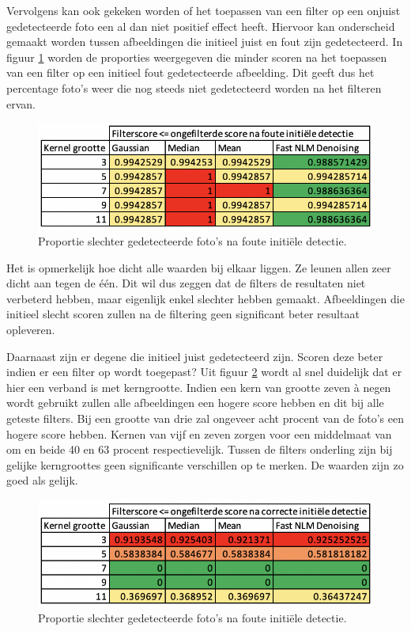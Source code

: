 Vervolgens kan ook gekeken worden of het toepassen van een filter op een onjuist gedetecteerde foto een al dan niet positief effect heeft.
Hiervoor kan onderscheid gemaakt worden tussen afbeeldingen die initieel juist en fout zijn gedetecteerd. 
In figuur \ref{fig:initieelfout} worden de proporties weergegeven die minder scoren na het toepassen van een filter op een initieel fout gedetecteerde afbeelding. Dit geeft dus het percentage foto's weer die nog steeds niet gedetecteerd worden na het filteren ervan.

\begin{figure}[h!]
  \includegraphics{img/initieelFout}
  \caption{Proportie slechter gedetecteerde foto's na foute initiële detectie.}
  \label{fig:initieelfout}
\end{figure}

Het is opmerkelijk hoe dicht alle waarden bij elkaar liggen. Ze leunen allen zeer dicht aan tegen de één. Dit wil dus zeggen dat de filters de resultaten niet verbeterd hebben, maar eigenlijk enkel slechter hebben gemaakt. Afbeeldingen die initieel slecht scoren zullen na de filtering geen significant beter resultaat opleveren. 

Daarnaast zijn er degene die initieel juist gedetecteerd zijn. Scoren deze beter indien er een filter op wordt toegepast?
Uit figuur \ref{fig:initieeljuist} wordt al snel duidelijk dat er hier een verband is met kerngrootte. Indien een kern van grootte zeven à negen wordt gebruikt zullen alle afbeeldingen een hogere score hebben en dit bij alle geteste filters. Bij een grootte van drie zal ongeveer acht procent van de foto's een hogere score hebben. Kernen van vijf en zeven zorgen voor een middelmaat van om en beide 40 en 63 procent respectievelijk. Tussen de filters onderling zijn bij gelijke kerngroottes geen significante verschillen op te merken. De waarden zijn zo goed als gelijk.  

\begin{figure}[h!]
  \includegraphics{img/initieeljuist}
  \caption{Proportie slechter gedetecteerde foto's na foute initiële detectie.}
  \label{fig:initieeljuist}
\end{figure}